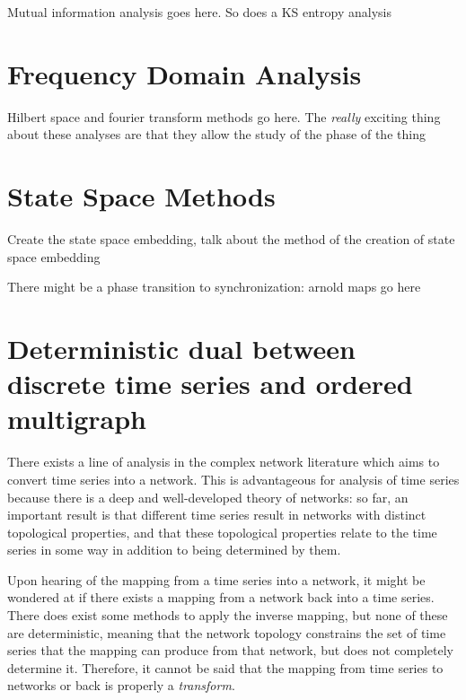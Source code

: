 \documentclass[12pt]{article}
\begin{document}

Mutual information analysis goes here. So does a KS entropy analysis

\section{Frequency Domain Analysis}
Hilbert space and fourier transform methods go here. The \emph{really} exciting thing about these analyses are that they allow the study of the phase of the thing


\section{State Space Methods}

Create the state space embedding, talk about the method of the creation of state space embedding

There might be a phase transition to synchronization: arnold maps go here

\section{Deterministic dual between discrete time series and ordered multigraph}

There exists a line of analysis in the complex network literature which aims to convert time series into a network. This is advantageous for analysis of time series because there is a deep and well-developed theory of networks: so far, an important result is that different time series result in networks with distinct topological properties, and that these topological properties relate to the time series in some way in addition to being determined by them. %


Upon hearing of the mapping from a time series into a network, it might be wondered at if there exists a mapping from a network back into a time series. There does exist some methods to apply the inverse mapping, but none of these are deterministic, meaning that the network topology constrains the set of time series that the mapping can produce from that network, but does not completely determine it. Therefore, it cannot be said that the mapping from time series to networks or back is properly a \emph{transform}.%
\end{document}
